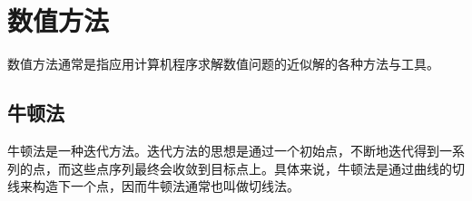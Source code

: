 
\chapter{数值方法}
\label{chap:numerical-method}

数值方法通常是指应用计算机程序求解数值问题的近似解的各种方法与工具。

\section{牛顿法}
\label{sec:Newton-method}

牛顿法是一种迭代方法。迭代方法的思想是通过一个初始点，不断地迭代得到一系列的点，而这些点序列最终会收敛到目标点上。具体来说，牛顿法是通过曲线的切线来构造下一个点，因而牛顿法通常也叫做切线法。
